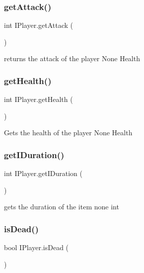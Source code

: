 \subsubsection{\texorpdfstring{get\+Attack()}{getAttack()}}
{\footnotesize\ttfamily int I\+Player.\+get\+Attack (\begin{DoxyParamCaption}{ }\end{DoxyParamCaption})\hspace{0.3cm}{\ttfamily [inline]}}

returns the attack of the player  None  Health \mbox{\label{class_i_player_a355f4da5d038c40df94194a2c545f526}} 
\subsubsection{\texorpdfstring{get\+Health()}{getHealth()}}
{\footnotesize\ttfamily int I\+Player.\+get\+Health (\begin{DoxyParamCaption}{ }\end{DoxyParamCaption})\hspace{0.3cm}{\ttfamily [inline]}}

Gets the health of the player  None  Health \mbox{\label{class_i_player_ad97d3469ea99b797926c1ec2c0b70c28}} 
\subsubsection{\texorpdfstring{get\+I\+Duration()}{getIDuration()}}
{\footnotesize\ttfamily int I\+Player.\+get\+I\+Duration (\begin{DoxyParamCaption}{ }\end{DoxyParamCaption})\hspace{0.3cm}{\ttfamily [inline]}}

gets the duration of the item  none  int \mbox{\label{class_i_player_a4575d071d3465f3c0808232c222eb7cb}} 
\subsubsection{\texorpdfstring{is\+Dead()}{isDead()}}
{\footnotesize\ttfamily bool I\+Player.\+is\+Dead (\begin{DoxyParamCaption}{ }\end{DoxyParamCaption})\hspace{0.3cm}{\ttfamily [inline]}}

